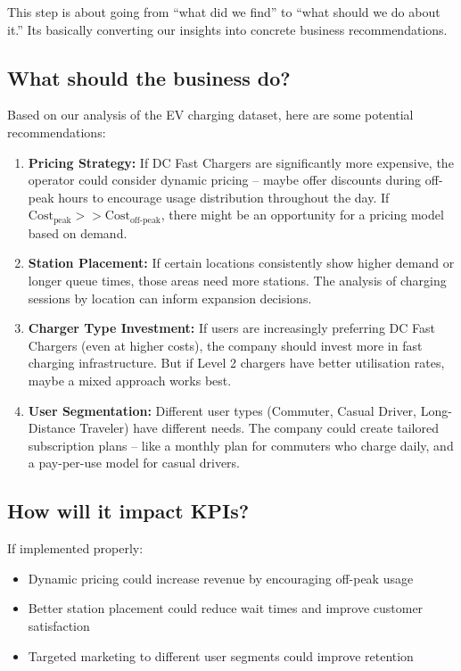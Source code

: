 \documentclass[12pt, a4paper]{article}
\begin{document}
This step is about going from ``what did we find'' to ``what should we do about it.'' Its basically converting our insights into concrete business recommendations.

\subsection{What should the business do?}

Based on our analysis of the EV charging dataset, here are some potential recommendations:

\begin{enumerate}
    \item \textbf{Pricing Strategy:} If DC Fast Chargers are significantly more expensive, the operator could consider dynamic pricing -- maybe offer discounts during off-peak hours to encourage usage distribution throughout the day. If $\text{Cost}_{\text{peak}} >> \text{Cost}_{\text{off-peak}}$, there might be an opportunity for a pricing model based on demand.
    
    \item \textbf{Station Placement:} If certain locations consistently show higher demand or longer queue times, those areas need more stations. The analysis of charging sessions by location can inform expansion decisions.
    
    \item \textbf{Charger Type Investment:} If users are increasingly preferring DC Fast Chargers (even at higher costs), the company should invest more in fast charging infrastructure. But if Level 2 chargers have better utilisation rates, maybe a mixed approach works best.
    
    \item \textbf{User Segmentation:} Different user types (Commuter, Casual Driver, Long-Distance Traveler) have different needs. The company could create tailored subscription plans -- like a monthly plan for commuters who charge daily, and a pay-per-use model for casual drivers.
\end{enumerate}

\subsection{How will it impact KPIs?}

If implemented properly:
\begin{itemize}
    \item Dynamic pricing could increase revenue by encouraging off-peak usage
    \item Better station placement could reduce wait times and improve customer satisfaction
    \item Targeted marketing to different user segments could improve retention
\end{itemize}
\end{document}
